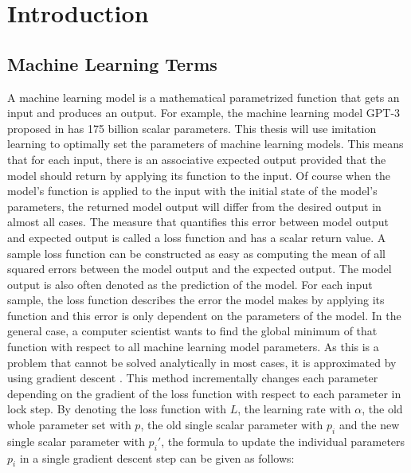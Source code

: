 \documentclass[draft,final]{vutinfth} %
\begin{document}

    \tableofcontents %

    \mainmatter

    \chapter{Introduction}

    \section{Machine Learning Terms}
    A machine learning model is a mathematical parametrized function that gets an input and produces an output.
    For example, the machine learning model GPT-3 proposed in \cite{GPT-3} has 175 billion scalar parameters.
    This thesis will use imitation learning to optimally set the parameters of machine learning models.
    This means that for each input, there is an associative expected output provided that the model should return by applying its function to the input.
    Of course when the model's function is applied to the input with the initial state of the model's parameters, the returned model output will differ from the desired output in almost all cases.
    The measure that quantifies this error between model output and expected output is called a loss function and has a scalar return value.
    A sample loss function can be constructed as easy as computing the mean of all squared errors between the model output and the expected output.
    The model output is also often denoted as the prediction of the model.
    For each input sample, the loss function describes the error the model makes by applying its function and this error is only dependent on the parameters of the model.
    In the general case, a computer scientist wants to find the global minimum of that function with respect to all machine learning model parameters.
    As this is a problem that cannot be solved analytically in most cases, it is approximated by using gradient descent \cite{GradientDescent}.
    This method incrementally changes each parameter depending on the gradient of the loss function with respect to each parameter in lock step.
    By denoting the loss function with $L$, the learning rate with $\alpha$, the old whole parameter set with $p$, the old single scalar parameter with $p_i$ and the new single scalar parameter with $p_i'$, the formula to update the individual parameters $p_i$ in a single gradient descent step can be given as follows:
\end{document}
